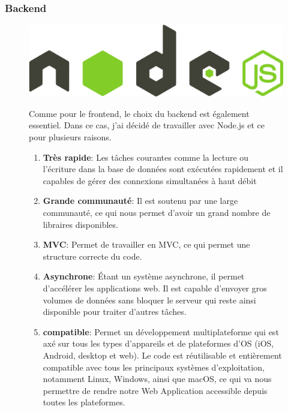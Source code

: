 \subsubsection{Backend}
\begin{figure}[H]
  \begin{minipage}{.3\textwidth}
    \includegraphics[width=0.75\linewidth]{img/node.png} 
  \end{minipage}
  \begin{minipage}{.7\textwidth}

    Comme pour le frontend, le choix du backend est également essentiel. Dans ce cas, j'ai décidé de travailler avec Node.js et ce pour plusieurs raisons.
    \begin{enumerate}
      \item \textbf{Très rapide}: Les tâches courantes comme la lecture ou l’écriture dans la base de données sont exécutées rapidement et il capables de gérer des connexions simultanées à haut débit
      \item \textbf{Grande communauté}: Il est soutenu par une large communauté, ce qui nous permet d'avoir un grand nombre de libraires disponibles.
      \item \textbf{MVC}: Permet de travailler en MVC, ce qui permet une structure correcte du code.
      \item \textbf{Asynchrone}: Étant un système asynchrone, il permet d’accélérer les applications web. Il est capable d'envoyer gros volumes de données sans bloquer le serveur qui reste ainsi disponible pour traiter d’autres tâches.
      \item \textbf{compatible}: Permet un développement multiplateforme qui est axé sur tous les types d'appareils et de plateformes d'OS (iOS, Android, desktop et web). Le code est réutilisable et entièrement compatible avec tous les principaux systèmes d'exploitation, notamment Linux, Windows, ainsi que macOS, ce qui va nous permettre de rendre notre Web Application accessible depuis toutes les plateformes.
    \end{enumerate}

  \end{minipage}
\end{figure}

